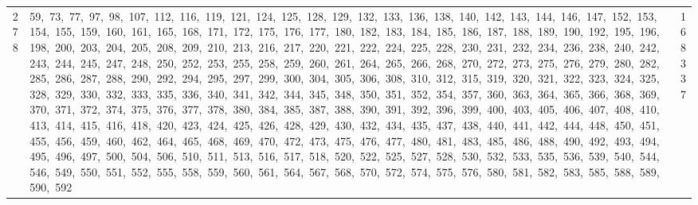 \begin{longtable}{c|p{}|r}
278 & 59,\ 73,\ 77,\ 97,\ 98,\ 107,\ 112,\ 116,\ 119,\ 121,\ 124,\ 125,\ 128,\ 129,\ 132,\ 133,\ 136,\ 138,\ 140,\ 142,\ 143,\ 144,\ 146,\ 147,\ 152,\ 153,\ 154,\ 155,\ 159,\ 160,\ 161,\ 165,\ 168,\ 171,\ 172,\ 175,\ 176,\ 177,\ 180,\ 182,\ 183,\ 184,\ 185,\ 186,\ 187,\ 188,\ 189,\ 190,\ 192,\ 195,\ 196,\ 198,\ 200,\ 203,\ 204,\ 205,\ 208,\ 209,\ 210,\ 213,\ 216,\ 217,\ 220,\ 221,\ 222,\ 224,\ 225,\ 228,\ 230,\ 231,\ 232,\ 234,\ 236,\ 238,\ 240,\ 242,\ 243,\ 244,\ 245,\ 247,\ 248,\ 250,\ 252,\ 253,\ 255,\ 258,\ 259,\ 260,\ 261,\ 264,\ 265,\ 266,\ 268,\ 270,\ 272,\ 273,\ 275,\ 276,\ 279,\ 280,\ 282,\ 285,\ 286,\ 287,\ 288,\ 290,\ 292,\ 294,\ 295,\ 297,\ 299,\ 300,\ 304,\ 305,\ 306,\ 308,\ 310,\ 312,\ 315,\ 319,\ 320,\ 321,\ 322,\ 323,\ 324,\ 325,\ 328,\ 329,\ 330,\ 332,\ 333,\ 335,\ 336,\ 340,\ 341,\ 342,\ 344,\ 345,\ 348,\ 350,\ 351,\ 352,\ 354,\ 357,\ 360,\ 363,\ 364,\ 365,\ 366,\ 368,\ 369,\ 370,\ 371,\ 372,\ 374,\ 375,\ 376,\ 377,\ 378,\ 380,\ 384,\ 385,\ 387,\ 388,\ 390,\ 391,\ 392,\ 396,\ 399,\ 400,\ 403,\ 405,\ 406,\ 407,\ 408,\ 410,\ 413,\ 414,\ 415,\ 416,\ 418,\ 420,\ 423,\ 424,\ 425,\ 426,\ 428,\ 429,\ 430,\ 432,\ 434,\ 435,\ 437,\ 438,\ 440,\ 441,\ 442,\ 444,\ 448,\ 450,\ 451,\ 455,\ 456,\ 459,\ 460,\ 462,\ 464,\ 465,\ 468,\ 469,\ 470,\ 472,\ 473,\ 475,\ 476,\ 477,\ 480,\ 481,\ 483,\ 485,\ 486,\ 488,\ 490,\ 492,\ 493,\ 494,\ 495,\ 496,\ 497,\ 500,\ 504,\ 506,\ 510,\ 511,\ 513,\ 516,\ 517,\ 518,\ 520,\ 522,\ 525,\ 527,\ 528,\ 530,\ 532,\ 533,\ 535,\ 536,\ 539,\ 540,\ 544,\ 546,\ 549,\ 550,\ 551,\ 552,\ 555,\ 558,\ 559,\ 560,\ 561,\ 564,\ 567,\ 568,\ 570,\ 572,\ 574,\ 575,\ 576,\ 580,\ 581,\ 582,\ 583,\ 585,\ 588,\ 589,\ 590,\ 592 & 168337 \\

\end{longtable}
